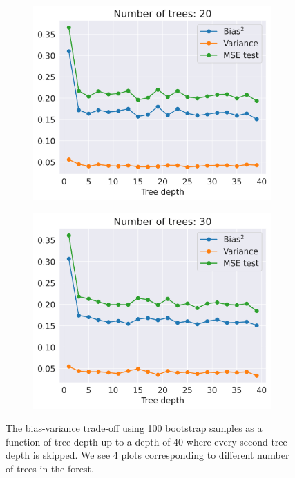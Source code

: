\documentclass[11pt]{article}
\begin{document}
\begin{figure}[H]
\begin{subfigure}{.5\textwidth}
        \includegraphics[width=.9\textwidth]{figures/tradeoff_RF_trees_20.png}
        \label{fig:}
    \end{subfigure}
    \begin{subfigure}{.5\textwidth}
        \centering
        \includegraphics[width=.9\textwidth]{figures/tradeoff_RF_trees_30.png}
        \label{fig:}
    \end{subfigure}
    \caption{The bias-variance trade-off using 100 bootstrap samples as a function of tree depth up to a depth of 40 where every second tree depth is skipped. We see 4 plots corresponding to different number of trees in the forest. }
    \label{fig:RF}
\end{figure}
\end{document}
